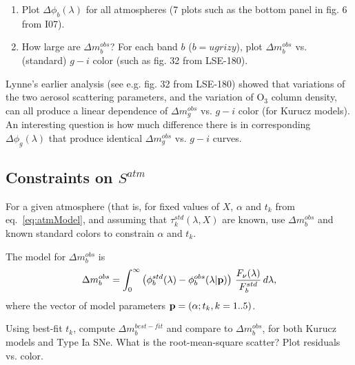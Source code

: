 \documentclass[12pt,preprint]{aastex}
\begin{document}
\begin{enumerate} 
\item Plot $\Delta \phi_b(\lambda)$ for all atmospheres (7 plots such as the
bottom panel in fig. 6 from I07). 
\item
How large are $\Delta m_b^{obs}$? 
For each band $b$ ($b=ugrizy$), plot $\Delta m_b^{obs}$ vs. (standard) $g-i$ color
(such as fig. 32 from LSE-180). 
\end{enumerate} 

Lynne's earlier analysis (see e.g. fig. 32 from LSE-180) showed that variations of the 
two aerosol scattering parameters, and the variation of O$_3$ column density, can all 
produce a linear dependence of $\Delta m_g^{obs}$ vs. $g-i$ color (for Kurucz models). 
An interesting question is how much difference there is in corresponding $\Delta \phi_g(\lambda)$
that produce identical $\Delta m_g^{obs}$ vs. $g-i$ curves. 





\subsection{Constraints on $S^{atm}$} 

For a given atmosphere (that is, for fixed values of $X$, $\alpha$ and $t_k$ from eq.~\ref{eq:atmModel}, 
and assuming that $\tau_k^{std}(\lambda, X)$ are known, use $\Delta m_b^{obs}$ and known standard 
colors to constrain $\alpha$ and $t_k$.  

The model for $\Delta m_b^{obs}$ is 
\begin{equation}
  \Delta m_b^{obs}  = \int_0^\infty { \left( \phi_b^{std}(\lambda) - \phi_b^{obs}(\lambda|{\bf p}) \right) \,  {F_\nu(\lambda) \over F_b^{std}} \, d\lambda},
\end{equation}
where the vector of model parameters ${\bf p} = (\alpha; t_k, k=1..5)$. 

Using best-fit $t_k$, compute $\Delta m_b^{best-fit}$ and compare to 
$\Delta m_b^{obs}$, for both Kurucz models and Type Ia SNe. What is the root-mean-square 
scatter? Plot residuals vs. color. 
\end{document}
